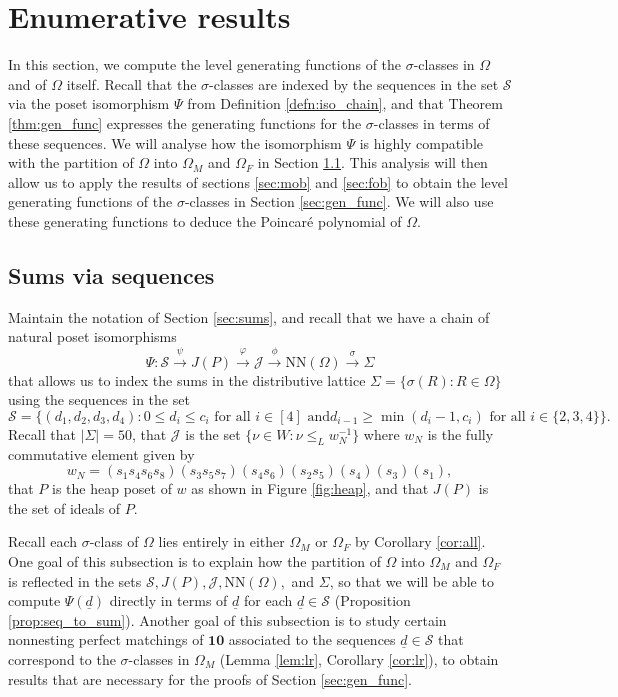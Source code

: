 \documentclass[11pt]{amsart}
\theoremstyle{plain}
\theoremstyle{definition}
\theoremstyle{remark}
\numberwithin{equation}{section}
\newcommand{\ra}{\rightarrow}
\newcommand{\wnn}{w_{N}}
\newcommand{\seqd}{\underline{d}}
\newcommand{\calj}{\mathcal{J}}
\newcommand{\cals}{\mathcal{S}}
\newcommand{\ten}{\mathbf{10}}
\newcommand{\ob}{\Omega}
\newcommand{\fob}{\Omega_F}
\newcommand{\mob}{\Omega_M}
\newcommand{\nn}{\mathrm{NN}}
\newcommand{\inverse}{^{-1}}
\newcommand{\abs}[1]{\lvert #1 \rvert}
\begin{document}
\section{Enumerative results}
\label{sec:enum}
In this section, we compute the level generating functions of the
$\sigma$-classes in $\ob$ and of $\ob$ itself. Recall that the $\sigma$-classes
are indexed by the sequences in the set $\cals$ via the poset isomorphism $\Psi$
from Definition \ref{defn:iso_chain}, and that Theorem \ref{thm:gen_func}
expresses the generating functions for the $\sigma$-classes in terms of these
sequences. We will analyse how the isomorphism $\Psi$ is highly compatible with
the partition of $\ob$ into $\mob$ and $\fob$ in Section \ref{sec:seq_to_sum}.
This analysis will then allow us to apply the results of sections \ref{sec:mob}
and \ref{sec:fob} to obtain the level generating functions of the
$\sigma$-classes in Section \ref{sec:gen_func}. We will also use these
generating functions to deduce the Poincar\'e polynomial of $\ob$.

\subsection{Sums via sequences}
\label{sec:seq_to_sum}
Maintain the notation of Section \ref{sec:sums}, and recall that we 
have a chain of
natural poset isomorphisms
\begin{equation*}
  \Psi:
 \cals\stackrel{\psi}{\ra} J(P) \stackrel{\varphi}{\ra} \calj
  \stackrel{\phi}{\ra} \nn(\ob)\stackrel{\sigma}{\ra} \Sigma
\end{equation*}
that allows us to index the sums in the distributive lattice
$\Sigma=\{\sigma(R):R\in \ob\}$ using the
sequences in the set 
\[
\cals=\{(d_1,d_2,d_3,d_4): 0 \le d_i\le c_i \text{ for all $i\in [4]$ and
$d_{i-1}\ge \min(d_i-1,c_i)$ for all $i\in \{2,3,4\}$}\}.
\]
Recall that $\abs{\Sigma}=50$, that $\calj$ is the set $\{\nu\in W:\nu\le_L
\wnn\inverse\}$ where $\wnn$ is
the fully commutative element given by 
\[
    \wnn=(s_1s_4s_6s_8)(s_3s_5s_7)(s_4s_6)(s_2s_5)(s_4)(s_3)(s_1), 
\]
that $P$ is the heap poset of $w$ as shown in Figure \ref{fig:heap}, and that
$J(P)$ is the set of ideals of $P$. 

Recall each $\sigma$-class of $\ob$ lies entirely in either $\mob$ or $\fob$ by
Corollary \ref{cor:all}. One goal of this subsection is to explain how the
partition of $\ob$ into $\mob$ and $\fob$ is reflected in the sets $\cals, J(P),
\calj, \nn(\ob),$ and $\Sigma$, so that we will be able to compute $\Psi(\seqd)$
directly in terms of $\seqd$ for each $\seqd\in \cals$ (Proposition
\ref{prop:seq_to_sum}). Another goal of this subsection is to study certain
nonnesting perfect matchings of $\ten$ associated to the sequences $\seqd\in \cals$
that correspond to the $\sigma$-classes in $\mob$ (Lemma \ref{lem:lr}, Corollary
\ref{cor:lr}), to obtain results that are necessary for the proofs of Section
\ref{sec:gen_func}. 
\end{document}
